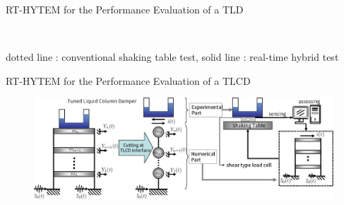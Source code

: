\documentclass[usepdftitle=false]{beamer}
\begin{document}
\begin{frame}{RT-HYTEM for the Performance Evaluation of a TLD}
\begin{figure}[!ht]
\centering
 \\
\label{fig:3-9}
\end{figure}
dotted line : conventional shaking table test, solid line : real-time hybrid test
\end{frame}











\begin{frame}{RT-HYTEM for the Performance Evaluation of a TLCD}
\begin{figure}[ht]
\centering
\includegraphics[width=1\textwidth] {figure/4-1.eps}
\label{fig:4-1}
\end{figure}
\end{frame}
\end{document}
